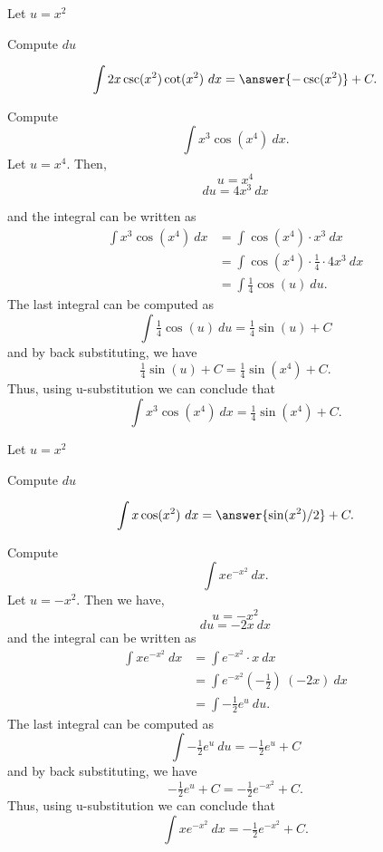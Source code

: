 \documentclass{ximera}
\begin{document}
\begin{problem}
\begin{hint}
Let $u = x^2$
\end{hint}
\begin{hint}
Compute $du$
\end{hint}
\[\int 2x\csc(x^2)\cot(x^2) \ dx = \answer{-\csc(x^2)} +C.\]
\end{problem}

\begin{example} Compute 
\[\int x^3\cos(x^4) \ dx.\]
Let $u = x^4$.  Then,
\[u = x^4\]
\[du = 4x^3 \ dx\]

and the integral can be written as 
\begin{align*}
\int x^3\cos(x^4) \ dx &= \int \cos(x^4) \cdot x^3\  dx \\
&=  \int \cos(x^4)\cdot \tfrac14 \cdot 4x^3\  dx\\
&=  \int \tfrac14\cos(u) \ du.
\end{align*}
The last integral can be computed as 
\[\int \tfrac14 \cos(u) \ du = \tfrac14 \sin(u) + C\]
and by back substituting, we have 
\[\tfrac14 \sin(u) + C = \tfrac14 \sin(x^4) + C.\]
Thus, using u-substitution we can conclude that
\[\int x^3\cos(x^4) \ dx =  \tfrac14 \sin(x^4) + C.\]
\end{example}

\begin{problem}
\begin{hint}
Let $u = x^2$
\end{hint}
\begin{hint}
Compute $du$
\end{hint}
\[\int x\cos(x^2) \ dx = \answer{\sin(x^2)/2} +C.\]
\end{problem}


\begin{example} Compute 
\[\int xe^{-x^2} \ dx.\]
Let $u = -x^2 $.  Then we have,
\[u = -x^2\]
\[du = -2x \ dx\]
and the integral can be written as
\begin{align*}
\int xe^{-x^2} \ dx &= \int e^{-x^2} \cdot x\  dx \\
&=  \int e^{-x^2}( -\tfrac12)\ (-2x)\  dx \\
&=  \int -\tfrac12 e^u \ du.
\end{align*}
The last integral can be computed as 
\[ \int -\tfrac12 e^u \ du = -\tfrac12 e^u + C\]
and by back substituting, we have 
\[-\tfrac12 e^u + C = -\tfrac12 e^{-x^2} + C.\]
Thus, using u-substitution we can conclude that
\[\int xe^{-x^2} \ dx =  -\tfrac12 e^{-x^2} + C.\]
\end{example}
\end{document}
